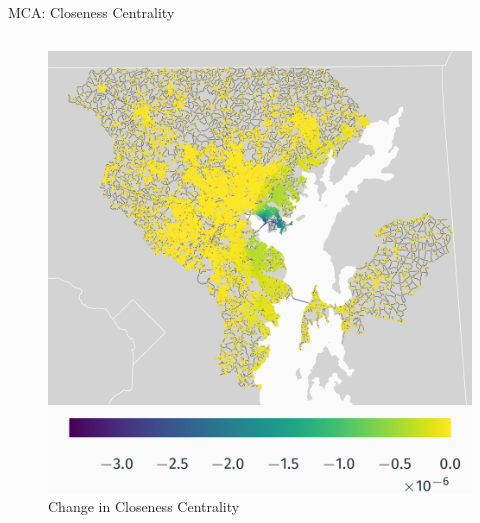 \documentclass{beamer}
\numberwithin{figure}{section} %
\numberwithin{table}{section} %
\begin{document}
\begin{frame}{MCA: Closeness Centrality}
\begin{columns}
        \begin{column}{0.33\textwidth}
            \begin{figure}
                \centering
                \includegraphics[width=\textwidth]{maps/closeness_diff.png}
                {\scriptsize Change in Closeness Centrality}
            \end{figure}
        \end{column}
    \end{columns}
\end{frame}
\end{document}
